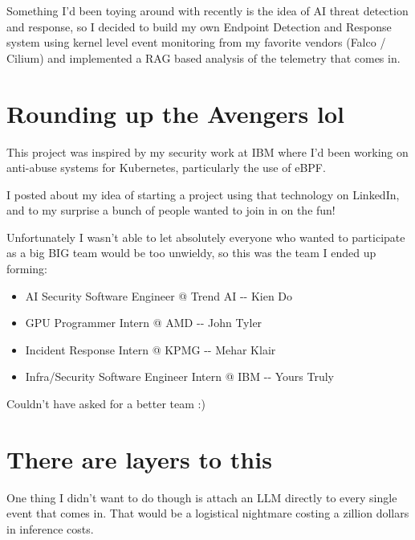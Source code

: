 

\newcommand{\DocTitle}{Kernel Harbor -- An EDR with LLM analysis of kernel events}
\newcommand{\DocDescription}{}
\newcommand{\DocTags}{writeup, Go, C, low-level, cybersecurity}




Something I'd been toying around with recently is the idea of AI threat detection and response, so I decided to build my own Endpoint Detection and Response system using kernel level event monitoring from my favorite vendors (Falco / Cilium) and implemented a RAG based analysis of the telemetry that comes in.

\section{Rounding up the Avengers lol}

This project was inspired by my security work at IBM where I'd been working on anti-abuse systems for Kubernetes, particularly the use of eBPF.

I posted about my idea of starting a project using that technology on LinkedIn, and to my surprise a bunch of people wanted to join in on the fun!

Unfortunately I wasn't able to let absolutely everyone who wanted to participate as a big BIG team would be too unwieldy, so this was the team I ended up forming:

\begin{itemize}
\item AI Security Software Engineer @ Trend AI -{}- Kien Do
\item GPU Programmer Intern @ AMD -{}- John Tyler
\item Incident Response Intern @ KPMG -{}- Mehar Klair
\item Infra/Security Software Engineer Intern @ IBM -{}- Yours Truly
\end{itemize}

Couldn't have asked for a better team :)

\section{There are layers to this}

One thing I didn't want to do though is attach an LLM directly to every single event that comes in. That would be a logistical nightmare costing a zillion dollars in inference costs.

